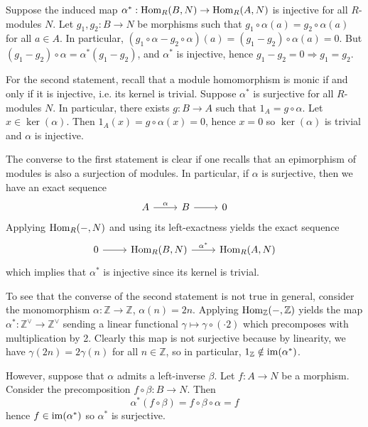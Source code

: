\documentclass[../../master.tex]{subfiles}
\begin{document}
\begin{solution}
    Suppose the induced map $\alpha^{*} : \operatorname{Hom}_R(B, N) \to \operatorname{Hom}_R(A, N)$ is injective for all $R$-modules $N$.
    Let $g_1, g_2 : B \to N$ be morphisms such that $g_1 \circ \alpha(a) = g_2 \circ \alpha(a)$ for all $a \in A$.
    In particular, $(g_1 \circ \alpha - g_2 \circ \alpha)(a) = (g_1 - g_2) \circ \alpha(a) = 0$.
    But $(g_1 - g_2) \circ \alpha = \alpha^{*} (g_1 - g_2)$, and $\alpha^{*}$ is injective, hence $g_1 - g_2 = 0 \Longrightarrow g_1 = g_2$.

    For the second statement, recall that a module homomorphism is monic if and only if it is injective, i.e. its kernel is trivial.
    Suppose $\alpha^{*}$ is surjective for all $R$-modules $N$.
    In particular, there exists $g : B \to A$ such that $1_A = g \circ \alpha$.
    Let $x \in \ker(\alpha)$.
    Then $1_A(x) = g \circ \alpha(x) = 0$, hence $x = 0$ so $\ker(\alpha)$ is trivial and $\alpha$ is injective.

    The converse to the first statement is clear if one recalls that an epimorphism of modules is also a surjection of modules.
    In particular, if $\alpha$ is surjective, then we have an exact sequence
    \[
    \begin{tikzcd}
        A & B & 0
        \arrow[from=1-1, to=1-2, "\alpha"]
        \arrow[from=1-2, to=1-3] 
    \end{tikzcd}
    \]
    Applying $\operatorname{Hom}_R(-, N)$ and using its left-exactness yields the exact sequence
    \[
    \begin{tikzcd}
        0 & \Hom_R(B, N) & \Hom_R(A, N)
        \arrow[from=1-1, to=1-2]
        \arrow[from=1-2, to=1-3, "\alpha^{*}"] 
    \end{tikzcd}
    \]
    which implies that $\alpha^{*}$ is injective since its kernel is trivial.

    To see that the converse of the second statement is not true in general, consider the monomorphism $\alpha : \mathbb{Z} \to \mathbb{Z}$, $\alpha(n) = 2n$.
    Applying $\operatorname{Hom}_\mathbb{Z}(-, \mathbb{Z})$ yields the map $\alpha^{*} : \mathbb{Z}^{\vee} \to \mathbb{Z}^{\vee}$ sending a linear functional $\gamma \mapsto \gamma \circ (\cdot 2)$ which precomposes with multiplication by 2.
    Clearly this map is not surjective because by linearity, we have $\gamma(2n) = 2\gamma(n)$ for all $n \in \mathbb{Z}$, so in particular, $1_{\mathbb{Z}} \notin \operatorname{im}(\alpha^{*})$.

    However, suppose that $\alpha$ admits a left-inverse $\beta$.
    Let $f : A \to N$ be a morphism.
    Consider the precomposition $f \circ \beta : B \to N$.
    Then
    \[
    \alpha^{*}(f \circ \beta) = f \circ \beta \circ \alpha = f
    \]
    hence $f \in \operatorname{im}(\alpha^{*})$ so $\alpha^{*}$ is surjective.
\end{solution}
\end{document}
